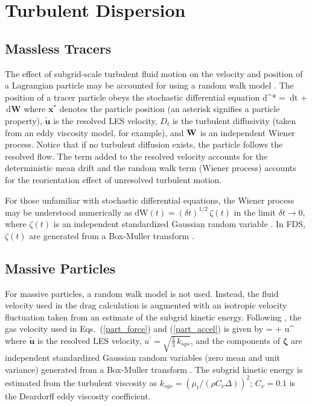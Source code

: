 \section{Turbulent Dispersion}

\subsection{Massless Tracers}

The effect of subgrid-scale turbulent fluid motion on the velocity and position of a Lagrangian particle may be accounted for using a random walk model \cite{Raman:CF}.  The position of a tracer particle obeys the stochastic differential equation
\be
\mbox{d}^* =  \,\mbox{d}t +  \,\mbox{d}\mbox{\textbf{W}}
\ee
where $\mathbf{x}^*$ denotes the particle position (an asterisk signifies a particle property), $\tilde{\mathbf{u}}$ is the resolved LES velocity, $D_t$ is the turbulent diffusivity (taken from an eddy viscosity model, for example), and $\mbox{\textbf{W}}$ is an independent Wiener process.  Notice that if no turbulent diffusion exists, the particle follows the resolved flow.  The term added to the resolved velocity accounts for the deterministic mean drift and the random walk term (Wiener process) accounts for the reorientation effect of unresolved turbulent motion.

For those unfamiliar with stochastic differential equations, the Wiener process may be understood numerically as $\mbox{dW}(t) = (\delta t)^{1/2} \, \zeta(t)$ in the limit $\delta t \rightarrow 0$, where $\zeta(t)$ is an independent standardized Gaussian random variable \cite{Pope:2000}.  In FDS, $\zeta(t)$ are generated from a Box-Muller transform \cite{Box-Muller:1958}.

\subsection{Massive Particles}

For massive particles, a random walk model is not used.  Instead, the fluid velocity used in the drag calculation is augmented with an isotropic velocity fluctuation taken from an estimate of the subgrid kinetic energy.  Following \cite{Breuer:2012}, the gas velocity used in Eqs.~(\ref{part_force}) and (\ref{part_accel}) is given by
\be
{} =  + u^\prime \, {\bm \zeta}
\ee
where $\tilde{\mathbf{u}}$ is the resolved LES velocity, $u^\prime = \sqrt{\frac{2}{3}\,k_{sgs}}$, and the components of $\bm \zeta$ are independent standardized Gaussian random variables (zero mean and unit variance) generated from a Box-Muller transform \cite{Box-Muller:1958}.  The subgrid kinetic energy is estimated from the turbulent viscosity as $k_{sgs} = (\mu_t/(\rho C_{\nu} \Delta))^2$; $C_\nu = 0.1$ is the Deardorff eddy viscosity coefficient.



